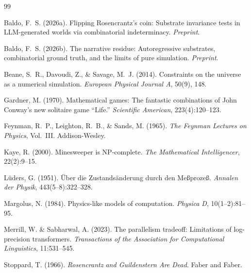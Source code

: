 \documentclass[12pt,a4paper]{article}
\theoremstyle{definition}
\theoremstyle{remark}
\begin{document}


\begin{thebibliography}{99}

Baldo, F.~S. (2026a).
\newblock Flipping {R}osencrantz's coin: Substrate invariance tests in
  {LLM}-generated worlds via combinatorial indeterminacy.
\newblock \textit{Preprint}.

Baldo, F.~S. (2026b).
\newblock The narrative residue: Autoregressive substrates, combinatorial
  ground truth, and the limits of pure simulation.
\newblock \textit{Preprint}.

Beane, S.~R., Davoudi, Z., \& Savage, M.~J. (2014).
\newblock Constraints on the universe as a numerical simulation.
\newblock \textit{European Physical Journal A}, 50(9), 148.

Gardner, M. (1970).
\newblock Mathematical games: The fantastic combinations of {J}ohn {C}onway's
  new solitaire game ``{L}ife.''
\newblock \textit{Scientific American}, 223(4):120--123.

Feynman, R.~P., Leighton, R.~B., \& Sands, M. (1965).
\newblock \textit{The Feynman Lectures on Physics}, Vol.~III.
\newblock Addison-Wesley.

Kaye, R. (2000).
\newblock Minesweeper is {NP}-complete.
\newblock \textit{The Mathematical Intelligencer}, 22(2):9--15.

Lüders, G. (1951).
\newblock Über die Zustandsänderung durch den Meßprozeß.
\newblock \textit{Annalen der Physik}, 443(5--8):322--328.

Margolus, N. (1984).
\newblock Physics-like models of computation.
\newblock \textit{Physica D}, 10(1--2):81--95.

Merrill, W. \& Sabharwal, A. (2023).
\newblock The parallelism tradeoff: Limitations of log-precision transformers.
\newblock \textit{Transactions of the Association for Computational
  Linguistics}, 11:531--545.

Stoppard, T. (1966).
\newblock \textit{Rosencrantz and Guildenstern Are Dead}.
\newblock Faber and Faber.


\end{thebibliography}
\end{document}
